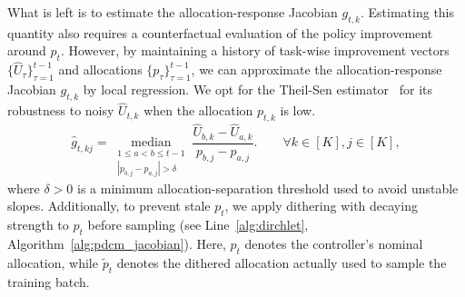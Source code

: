 \label{sec:curv_est}
What is left is to estimate the allocation-response Jacobian $g_{t, k}$. Estimating this quantity also requires a counterfactual evaluation of the policy improvement around $p_t$. However, by maintaining a history of task-wise improvement vectors $\{\widehat U_\tau\}_{\tau=1}^{t-1}$ and allocations $\{p_\tau\}_{\tau=1}^{t-1}$, we can approximate the allocation-response Jacobian $g_{t, k}$ by local regression. We opt for the Theil-Sen estimator~\citep{Theil1992} for its robustness to noisy $\hat{U}_{t, k}$ when the allocation $p_{t, k}$ is low.
\vspace{-0.01in}
\begin{equation} \label{eq:theil-sen}
\widehat g_{t,kj}
=
\operatorname*{median}_{\substack{1\le a<b\le t-1\\ |p_{b,j}-p_{a,j}|>\delta}}
\frac{\widehat U_{b,k}-\widehat U_{a,k}}{p_{b,j}-p_{a,j}} .
\qquad
\forall k\in[K], j\in[K],
\end{equation}
where \(\delta>0\) is a minimum allocation-separation threshold used to avoid unstable slopes. Additionally, to prevent stale $p_t$, we apply dithering with decaying strength to
$p_t$ before sampling (see Line~\ref{alg:dirchlet}, Algorithm~\ref{alg:pdcm_jacobian}).
Here, $p_t$ denotes the controller's nominal allocation, while
$\tilde{p}_t$ denotes the dithered allocation actually used to sample
the training batch.
